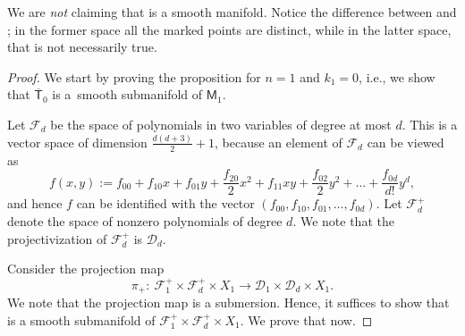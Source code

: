 \begin{rem}
 We are \emph{not} claiming that
is a smooth manifold. Notice the difference between
and ; in the former space
all the marked points are distinct, while in the latter space, that is not necessarily true.
\end{rem}

\begin{proof}
We start by proving the proposition for $n = 1$
and $k_1 = 0$, i.e., we show that $\overline{\mathsf{T}}_0$ is a~smooth
submanifold of $\mathsf{M}_1$.

Let $\mathcal{F}_d$ be the space of
polynomials in two variables of degree at most $d$.
This is a vector space of dimension $\frac{d(d+3)}{2} + 1$, because
an element of $\mathcal{F}_d$ can be viewed as
\[
 f(x, y) := f_{00} + f_{10}x + f_{01} y + \frac{f_{20}}{2} x^2 + f_{11} xy + \frac{f_{02}}{2} y^2 +
\dots + \frac{f_{0d}}{d!} y^d,
\]
and hence $f$ can be identified with the vector
$(f_{00}, f_{10}, f_{01},\dots, f_{0d})$.
Let $\mathcal{F}_d^{+}$ denote the space of nonzero polynomials of degree $d$.
We note that the projectivization of $\mathcal{F}_d^{+}$ is $\mathcal{D}_d$.

Consider the projection map
\[ \pi_{+}\colon\ \mathcal{F}_1^{+} \times \mathcal{F}_d^{+} \times X_1 \longrightarrow
\mathcal{D}_1 \times \mathcal{D}_d \times X_1.  \]
We note that the projection map is a submersion. Hence, it suffices to show that
 is a smooth submanifold of
$\mathcal{F}_1^{+} \times \mathcal{F}_d^{+} \times X_1$. We prove that now.


\end{proof}
